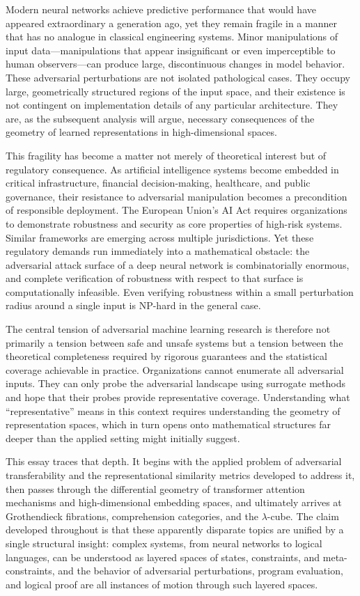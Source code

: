 \documentclass[12pt,a4paper]{article}
\theoremstyle{plain}
\theoremstyle{definition}
\begin{document}
Modern neural networks achieve predictive performance that would have appeared
extraordinary a generation ago, yet they remain fragile in a manner that has no
analogue in classical engineering systems. Minor manipulations of input
data---manipulations that appear insignificant or even imperceptible to human
observers---can produce large, discontinuous changes in model behavior. These
adversarial perturbations are not isolated pathological cases. They occupy
large, geometrically structured regions of the input space, and their existence
is not contingent on implementation details of any particular architecture.
They are, as the subsequent analysis will argue, necessary consequences of the
geometry of learned representations in high-dimensional spaces.

This fragility has become a matter not merely of theoretical interest but of
regulatory consequence. As artificial intelligence systems become embedded in
critical infrastructure, financial decision-making, healthcare, and public
governance, their resistance to adversarial manipulation becomes a precondition
of responsible deployment. The European Union's AI Act requires organizations to
demonstrate robustness and security as core properties of high-risk systems.
Similar frameworks are emerging across multiple jurisdictions. Yet these
regulatory demands run immediately into a mathematical obstacle: the adversarial
attack surface of a deep neural network is combinatorially enormous, and
complete verification of robustness with respect to that surface is
computationally infeasible. Even verifying robustness within a small
perturbation radius around a single input is NP-hard in the general case.

The central tension of adversarial machine learning research is therefore not
primarily a tension between safe and unsafe systems but a tension between the
theoretical completeness required by rigorous guarantees and the statistical
coverage achievable in practice. Organizations cannot enumerate all adversarial
inputs. They can only probe the adversarial landscape using surrogate methods
and hope that their probes provide representative coverage. Understanding what
``representative'' means in this context requires understanding the geometry of
representation spaces, which in turn opens onto mathematical structures far
deeper than the applied setting might initially suggest.

This essay traces that depth. It begins with the applied problem of adversarial
transferability and the representational similarity metrics developed to address
it, then passes through the differential geometry of transformer attention
mechanisms and high-dimensional embedding spaces, and ultimately arrives at
Grothendieck fibrations, comprehension categories, and the $\lambda$-cube. The
claim developed throughout is that these apparently disparate topics are unified
by a single structural insight: complex systems, from neural networks to logical
languages, can be understood as layered spaces of states, constraints, and
meta-constraints, and the behavior of adversarial perturbations, program
evaluation, and logical proof are all instances of motion through such layered
spaces.
\end{document}
